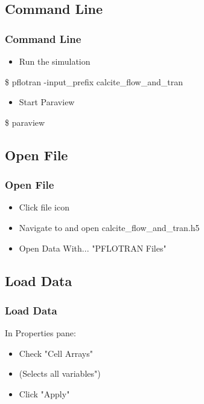 \documentclass{beamer}
\begin{document}
\subsection{Command Line}

\begin{frame}[fragile]\frametitle{Command Line}
\begin{itemize}
  \item{Run the simulation}
\end{itemize}
\begin{semiverbatim}
\$ pflotran -input_prefix calcite_flow_and_tran
\end{semiverbatim}
\begin{itemize}
  \item{Start Paraview}
\end{itemize}
\begin{semiverbatim}
\$ paraview
\end{semiverbatim}
\end{frame}

\subsection{Open File}

\begin{frame}[fragile]\frametitle{Open File}

\begin{itemize}
  \item Click file icon
  \item Navigate to and open calcite\_flow\_and\_tran.h5 
  \item Open Data With... "PFLOTRAN Files"
\end{itemize}

\end{frame}

\subsection{Load Data}

\begin{frame}[fragile]\frametitle{Load Data}
In Properties pane:
\begin{itemize}
  \item Check "Cell Arrays"
  \item (Selects all variables")
  \item Click "Apply"
\end{itemize}

\end{frame}
\end{document}
